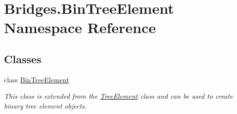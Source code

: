 \hypertarget{namespace_bridges_1_1_bin_tree_element}{}\section{Bridges.\+Bin\+Tree\+Element Namespace Reference}
\label{namespace_bridges_1_1_bin_tree_element}
\subsection*{Classes}
\begin{DoxyCompactItemize}
\item 
class \mbox{\hyperlink{class_bridges_1_1_bin_tree_element_1_1_bin_tree_element}{Bin\+Tree\+Element}}
\begin{DoxyCompactList}\small\item\em This class is extended from the \mbox{\hyperlink{namespace_bridges_1_1_tree_element}{Tree\+Element}} class and can be used to create binary tree element objects. \end{DoxyCompactList}\end{DoxyCompactItemize}

